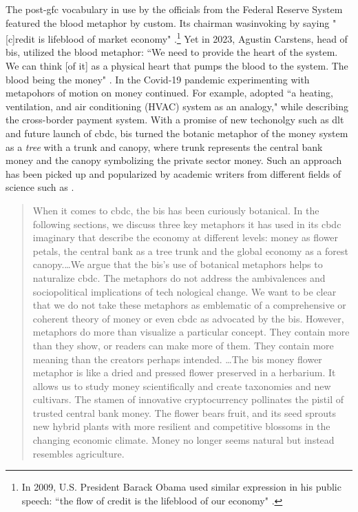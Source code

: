 The post-\ac{gfc} vocabulary in use by the officials from the Federal Reserve System featured the blood metaphor by custom. Its chairman wasinvoking by saying "[c]redit is lifeblood of market economy" \citep{bernanke2009}.\footnote{In 2009, U.S. President Barack Obama used similar expression in his public speech: ``the flow of credit is the lifeblood of our economy" \citep{weston2013}.} Yet in 2023, Agustin Carstens, head of \ac{bis}, utilized the blood metaphor: ``We need to provide the heart of the system. We can think [of it] as a physical heart that pumps the blood to the system. The blood being the money" \citep{bis2023}.  In the Covid-19 pandemic experimenting with metapohors of motion on money continued. For example, \cite{mcdowell} adopted ``a heating, ventilation, and air conditioning (HVAC) system as an analogy," while describing the cross-border payment system. With a promise of new techonolgy such as \ac{dlt} and future launch of \ac{cbdc}, \ac{bis} turned the botanic metaphor of the money system as a \textit{tree} with a trunk and canopy, where trunk represents the central bank money and the canopy symbolizing the private sector money. Such an approach has been picked up and popularized by academic writers from different fields of science such as \citep{swartz2023}. 

\begin{quote}
When it comes to \ac{cbdc}, the \ac{bis} has been curiously botanical. In the following sections, we discuss three key metaphors it has used in its \ac{cbdc} imaginary that describe 
the economy at different levels: money as flower petals, the central bank as a tree trunk and the global economy as a forest canopy.\dots We argue that the \ac{bis}'s use of botanical metaphors helps to naturalize \ac{cbdc}. The metaphors do not address the ambivalences and sociopolitical implications of tech nological change. We want to be clear that we do not take these metaphors as emblematic of a comprehensive or coherent theory of money or even \ac{cbdc} as advocated by the \ac{bis}. However, metaphors do more than visualize a particular concept. They contain more than they show, or readers can make more of them. They contain more meaning than the creators perhaps intended. \dots The \ac{bis} money flower metaphor is like a dried and pressed flower preserved in a herbarium. It allows us to study money scientifically and create taxonomies and new cultivars. The stamen of innovative cryptocurrency pollinates the pistil of trusted central bank money. The flower bears fruit, and its seed sprouts new hybrid plants with more resilient and competitive blossoms in the changing economic climate. Money no longer seems natural but instead resembles agriculture. \citep[pp.~13-14]{swartz2023}
\end{quote}

